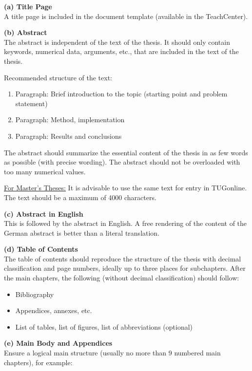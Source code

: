 \documentclass[a4paper, fleqn, headsepline, footsepline, 12pt, parskip=half]{scrartcl}
\begin{document}
\textbf{(a) Title Page} \\
A title page is included in the document template (available in the TeachCenter).

\textbf{(b) Abstract} \\
The abstract is independent of the text of the thesis. It should only contain keywords, numerical data, arguments, etc., that are included in the text of the thesis.

Recommended structure of the text:
\begin{enumerate}
    \item Paragraph: Brief introduction to the topic (starting point and problem statement)
    \item Paragraph: Method, implementation
    \item Paragraph: Results and conclusions
\end{enumerate}

The abstract should summarize the essential content of the thesis in as few words as possible (with precise wording). The abstract should not be overloaded with too many numerical values.

\underline{For Master's Theses:} It is advisable to use the same text for entry in TUGonline. The text should be a maximum of \num{4000} characters.

\textbf{(c) Abstract in English} \\
This is followed by the abstract in English. A free rendering of the content of the German abstract is better than a literal translation.

\textbf{(d) Table of Contents} \\
The table of contents should reproduce the structure of the thesis with decimal classification and page numbers, ideally up to three places for subchapters. After the main chapters, the following (without decimal classification) should follow:

\begin{itemize}
    \item Bibliography
    \item Appendices, annexes, etc.
    \item List of tables, list of figures, list of abbreviations (optional)
\end{itemize}

\textbf{(e) Main Body and Appendices} \\
Ensure a logical main structure (usually no more than 9 numbered main chapters), for example:
\end{document}
